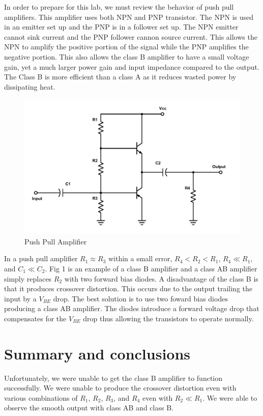 \documentclass[11pt,letterpaper,onecolumn]{article}
\begin{document}
 In order to prepare for this lab, we must review the behavior of push pull amplifiers. This amplifier uses both NPN and PNP transistor. The NPN is used in an emitter set up and the PNP is in a follower set up. The NPN emitter cannot sink current and the PNP follower cannon source current. This allows the NPN to amplify the positive portion of the signal while the PNP amplifies the negative portion. This also allows the class B amplifier to have a small voltage gain, yet a much larger power gain and input impedance compared to the output. The Class B is more efficient than a class A as it reduces wasted power by dissipating heat.  
\begin{figure}[H]
    \centering
    \includegraphics[scale = .7]{lab8cir.pdf}
    \caption{Push Pull Amplifier}
    \label{fig:my_label}
\end{figure}

In a push pull amplifier $R_1 \approx R_3$ within a small error, $R_4 < R_2 < R_1$, $R_4 \ll R_1$, and $C_1 \ll C_2$. Fig 1 is an example of a class B amplifier and a class AB amplifier simply replaces $R_2$ with two forward bias diodes. A disadvantage of the class B is that it produces crossover distortion. This occurs due to the output trailing the input by a $V_{BE}$ drop. The best solution is to use two foward bias diodes producing a class AB amplifier. The diodes introduce a forward voltage drop that compensates for the $V_{BE}$ drop thus allowing the transistors to operate normally. 

\section{Summary and conclusions}

Unfortunately, we were unable to get the class B amplifier to function successfully. We were unable to produce the crossover distortion even with various combinations of $R_1$, $R_2$, $R_3$, and $R_4$ even with $R_2 \ll R_1$. We were able to observe the smooth output with class AB and class B. 
\end{document}
